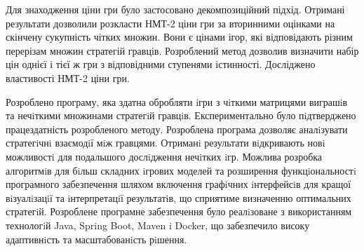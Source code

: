 \documentclass[14pt, a4paper, oneside]{extarticle}
\numberwithin{equation}{section}
\begin{document}
Для знаходження ціни гри було застосовано декомпозиційний підхід. Отримані результати дозволили розкласти НМТ-2 ціни гри за вторинними оцінками на скінчену сукупність чітких множин. Вони є цінами ігор, які відповідають різним перерізам множин стратегій гравців. Розроблений метод дозволив визначити набір цін однієї і тієї ж гри з відповідними  ступенями істинності. Досліджено властивості НМТ-2 ціни гри.

Розроблено програму, яка здатна обробляти iгри з чiткими матрицями виграшiв та нечiткими множинами стратегiй гравцiв. Експериментально було пiдтверджено працездатність розробленого методу. Розроблена програма дозволяє аналiзувати стратегiчнi взаємодiї мiж гравцями. Отриманi результати вiдкривають новi можливостi для подальшого дослiдження нечiтких iгр. Можлива розробка алгоритмiв для бiльш складних iгрових моделей та розширення функцiональностi програмного забезпечення шляхом включення графiчних iнтерфейсiв для кращої вiзуалiзацiї та iнтерпретацiї результатiв, що сприятиме визначенню оптимальних стратегiй. Розроблене програмне забезпечення було реалiзоване з використанням технологiй Java, Spring Boot, Maven i Docker, що забезпечило високу адаптивнiсть та масштабованiсть рiшення. 
\end{document}
